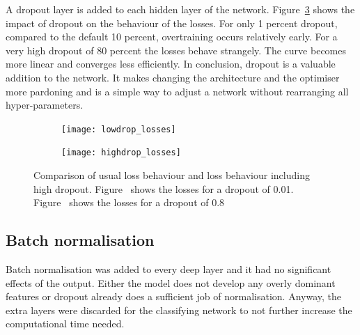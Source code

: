 A dropout layer is added to each hidden layer of the network.
Figure~\ref{fig:dropout} shows the impact of dropout on the behaviour of the losses. For only \num{1} percent dropout, compared to the default \num{10} percent, overtraining occurs relatively early. For a very high dropout of \num{80} percent the losses behave strangely. The curve becomes more linear and converges less efficiently. In conclusion, dropout is a valuable addition to the network. It makes changing the architecture and the optimiser more pardoning and is a simple way to adjust a network without rearranging all hyper-parameters.

\begin{figure}[htbp]
    \centering
    \begin{subfigure}[b]{0.45\textwidth}
        \texttt{[image: lowdrop\_losses]}
        \caption{}
        \label{fig:dropout:low}
    \end{subfigure}
\quad
    \begin{subfigure}[b]{0.45\textwidth}
        \texttt{[image: highdrop\_losses]}
        \caption{}
        \label{fig:dropout:high}
    \end{subfigure}
    \caption[Performance of the classifier for different dropout percentages]{Comparison of usual loss behaviour and loss behaviour including high dropout. Figure~ shows the losses for a dropout of \num{0.01}. Figure~ shows the losses for a dropout of \num{0.8}}
	\label{fig:dropout}
\end{figure}


\subsection{Batch normalisation}

Batch normalisation was added to every deep layer and it had no significant effects of the output. Either the model does not develop any overly dominant features or dropout already does a sufficient job of normalisation. Anyway, the extra layers were discarded for the classifying network to not further increase the computational time needed.

